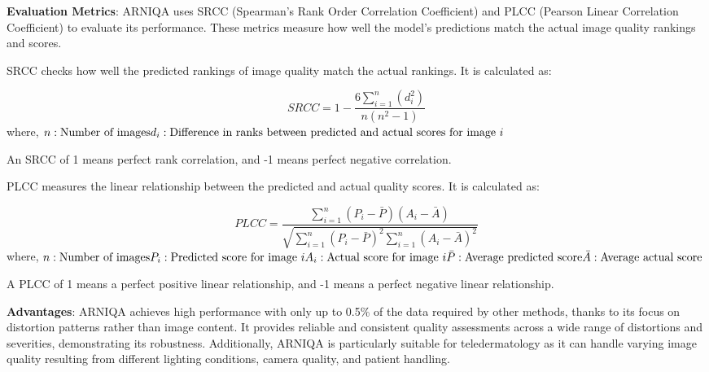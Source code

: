 \vspace{\baselineskip}
\noindent
\textbf{Evaluation Metrics}: ARNIQA uses SRCC (Spearman’s Rank Order Correlation Coefficient) and PLCC (Pearson Linear Correlation Coefficient) to evaluate its performance. These metrics measure how well the model's predictions match the actual image quality rankings and scores. \par
\vspace{\baselineskip}
\noindent
SRCC checks how well the predicted rankings of image quality match the actual rankings. It is calculated as: \par
\begin{equation}
    SRCC = 1 - \frac{6 \sum_{i=1}^n (d_i^2)}{n(n^2 - 1)}
\end{equation}
\noindent
where, \newline
$n: \text{Number of images} \\ d_i: \text{Difference in ranks between predicted and actual scores for image } i$ \par
\vspace{\baselineskip}
\noindent
An SRCC of 1 means perfect rank correlation, and -1 means perfect negative correlation. \par
\vspace{\baselineskip}
\noindent
PLCC measures the linear relationship between the predicted and actual quality scores. It is calculated as: \par
\begin{equation}
    PLCC = \frac{\sum_{i=1}^n (P_i - \bar{P})(A_i - \bar{A})}{\sqrt{\sum_{i=1}^n (P_i - \bar{P})^2 \sum_{i=1}^n (A_i - \bar{A})^2}}
\end{equation}
\noindent
where, \newline
$n: \text{Number of images} \\ P_i: \text{Predicted score for image } i \\ A_i: \text{Actual score for image } i \\ \bar{P}: \text{Average predicted score} \\ \bar{A}: \text{Average actual score}$ \par
\vspace{\baselineskip}
\noindent
A PLCC of 1 means a perfect positive linear relationship, and -1 means a perfect negative linear relationship. \par
\vspace{\baselineskip}
\noindent
\textbf{Advantages}: ARNIQA achieves high performance with only up to 0.5\% of the data required by other methods, thanks to its focus on distortion patterns rather than image content. It provides reliable and consistent quality assessments across a wide range of distortions and severities, demonstrating its robustness. Additionally, ARNIQA is particularly suitable for teledermatology as it can handle varying image quality resulting from different lighting conditions, camera quality, and patient handling. \par


